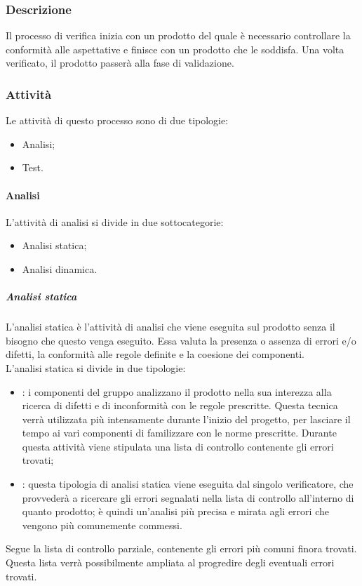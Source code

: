 \documentclass[../norme-di-progetto.tex]{subfiles}
\begin{document}
\subsubsection{Descrizione}
Il processo di verifica inizia con un prodotto del quale è necessario controllare la conformità alle aspettative e finisce con un prodotto che le soddisfa. Una volta verificato, il prodotto passerà alla fase di validazione.

\subsubsection{Attività}
Le attività di questo processo sono di due tipologie:
\begin{itemize}
  \item Analisi;
  \item Test.
\end{itemize}
\paragraph{Analisi}
L'attività di analisi si divide in due sottocategorie:
\begin{itemize}
  \item Analisi statica;
  \item Analisi dinamica.
\end{itemize}
\subparagraph{Analisi statica}
L'analisi statica è l'attività di analisi che viene eseguita sul prodotto senza il bisogno che questo venga eseguito. Essa valuta la presenza o assenza di errori e/o difetti, la conformità alle regole definite e la coesione dei componenti. \\
L'analisi statica si divide in due tipologie:
\begin{itemize}
  \item \textbf{}: i componenti del gruppo analizzano il prodotto nella sua interezza alla ricerca di difetti e di inconformità con le regole prescritte. Questa tecnica verrà utilizzata più intensamente durante l'inizio del progetto, per lasciare il tempo ai vari componenti di familizzare con le norme prescritte. Durante questa attività viene stipulata una lista di controllo contenente gli errori trovati;
  \item \textbf{}: questa tipologia di analisi statica viene eseguita dal singolo verificatore, che provvederà a ricercare gli errori segnalati nella lista di controllo all'interno di quanto prodotto; è quindi un'analisi più precisa e mirata agli errori che vengono più comunemente commessi.
\end{itemize}
Segue la lista di controllo parziale, contenente gli errori più comuni finora trovati. Questa lista verrà possibilmente ampliata al progredire degli eventuali errori trovati.
\end{document}
